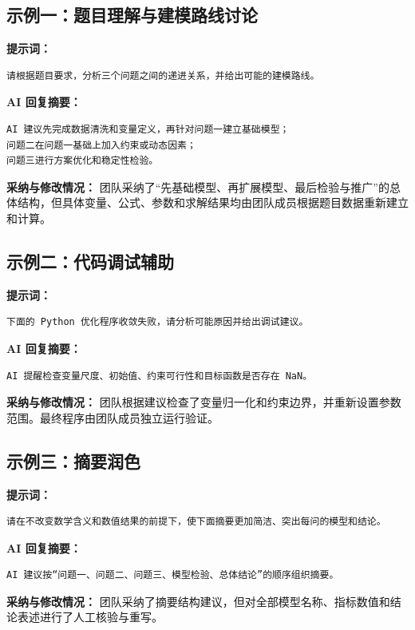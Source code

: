 \documentclass[a4paper]{ctexart}
\begin{document}
\subsection{示例一：题目理解与建模路线讨论}
\noindent\textbf{提示词：}
\begin{lstlisting}
请根据题目要求，分析三个问题之间的递进关系，并给出可能的建模路线。
\end{lstlisting}

\noindent\textbf{AI 回复摘要：}
\begin{lstlisting}
AI 建议先完成数据清洗和变量定义，再针对问题一建立基础模型；
问题二在问题一基础上加入约束或动态因素；
问题三进行方案优化和稳定性检验。
\end{lstlisting}

\noindent\textbf{采纳与修改情况：}
团队采纳了“先基础模型、再扩展模型、最后检验与推广”的总体结构，但具体变量、公式、参数和求解结果均由团队成员根据题目数据重新建立和计算。

\subsection{示例二：代码调试辅助}
\noindent\textbf{提示词：}
\begin{lstlisting}
下面的 Python 优化程序收敛失败，请分析可能原因并给出调试建议。
\end{lstlisting}

\noindent\textbf{AI 回复摘要：}
\begin{lstlisting}
AI 提醒检查变量尺度、初始值、约束可行性和目标函数是否存在 NaN。
\end{lstlisting}

\noindent\textbf{采纳与修改情况：}
团队根据建议检查了变量归一化和约束边界，并重新设置参数范围。最终程序由团队成员独立运行验证。

\subsection{示例三：摘要润色}
\noindent\textbf{提示词：}
\begin{lstlisting}
请在不改变数学含义和数值结果的前提下，使下面摘要更加简洁、突出每问的模型和结论。
\end{lstlisting}

\noindent\textbf{AI 回复摘要：}
\begin{lstlisting}
AI 建议按“问题一、问题二、问题三、模型检验、总体结论”的顺序组织摘要。
\end{lstlisting}

\noindent\textbf{采纳与修改情况：}
团队采纳了摘要结构建议，但对全部模型名称、指标数值和结论表述进行了人工核验与重写。
\end{document}
